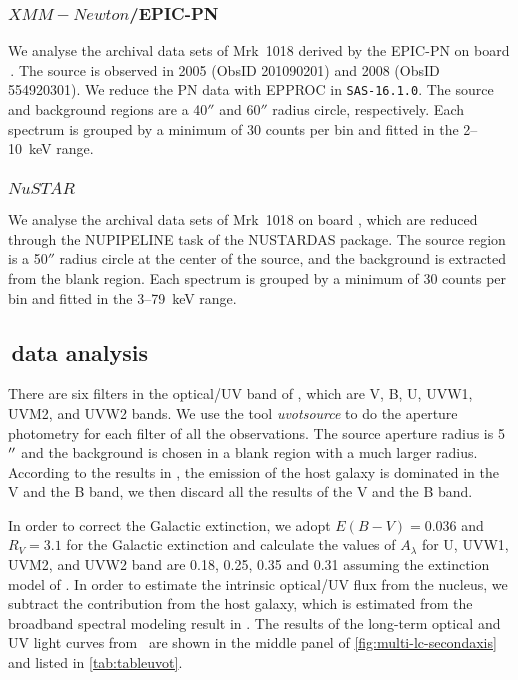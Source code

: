 \subsubsection{$XMM-Newton$/EPIC-PN }
We analyse the archival data sets of Mrk~1018 derived by the EPIC-PN on board \xmm\,. The source is observed in 2005 (ObsID 201090201) and 2008 (ObsID 554920301). We reduce the PN data with {\scriptsize EPPROC} in \texttt{SAS-16.1.0}. The source and background regions are a 40$''$ and 60$''$ radius circle, respectively. Each spectrum is grouped by a minimum of 30 counts per bin and fitted in the 2--10~keV range. 


\subsubsection{$NuSTAR$}
We analyse the archival data sets of Mrk~1018 on board \nustar, which are reduced through the {\scriptsize NUPIPELINE} task of the {\scriptsize NUSTARDAS} package. The source region is a 50$''$ radius circle at the center of the source, and the background is extracted from the blank region. Each spectrum is grouped by a minimum of 30 counts per bin and fitted in the 3--79~keV range.

\subsection{\uvot\,data analysis}
\label{sec:uvot}
There are six filters in the optical/UV band of \uvot, which are V, B, U, UVW1, UVM2, and UVW2 bands. We use the tool \textit{uvotsource} to do the aperture photometry for each filter of all the observations. The source aperture radius is 5$\hbox{$^{\prime\prime}$}$ and the background is chosen in a blank region with a much larger radius. According to the results in \citet{2018MNRAS.480.3898N}, the emission of the host galaxy is dominated in the V and the B band, we then discard all the results of the V and the B band. 

In order to correct the Galactic extinction, we adopt $E(B-V) = 0.036$ \citep[see][]{2018MNRAS.480.3898N} and $R_{V}=3.1$ for the Galactic extinction and calculate the values of $A_{\lambda}$ for U, UVW1, UVM2, and UVW2 band are  0.18, 0.25, 0.35 and 0.31 assuming the extinction model of \citet{2007ApJ...663..320F}. In order to estimate the intrinsic optical/UV flux from the nucleus, we subtract the contribution from the host galaxy, which is estimated from the broadband spectral modeling result in \citet{2018MNRAS.480.3898N}. The results of the long-term optical and UV light curves from \uvot\, are shown in the middle panel of \autoref{fig:multi-lc-secondaxis} and listed in \autoref{tab:tableuvot}.




